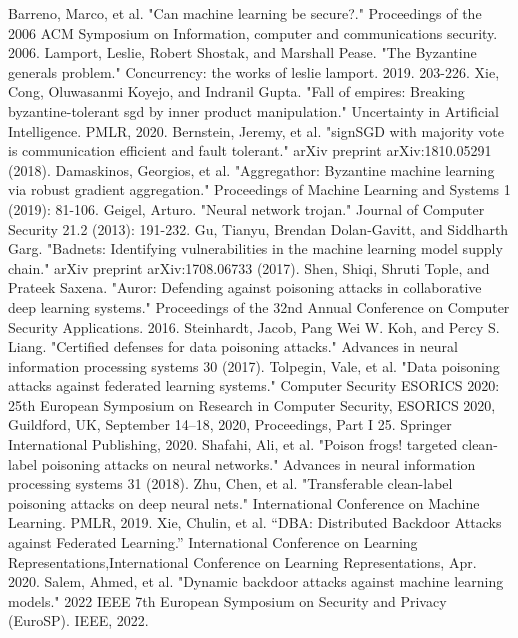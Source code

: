 \documentclass[conference]{IEEEtran}
\begin{document}
\begin{thebibliography}{00}
     Barreno, Marco, et al. "Can machine learning be secure?." Proceedings of the 2006 ACM Symposium on Information, computer and communications security. 2006.
     Lamport, Leslie, Robert Shostak, and Marshall Pease. "The Byzantine generals problem." Concurrency: the works of leslie lamport. 2019. 203-226.
     Xie, Cong, Oluwasanmi Koyejo, and Indranil Gupta. "Fall of empires: Breaking byzantine-tolerant sgd by inner product manipulation." Uncertainty in Artificial Intelligence. PMLR, 2020.
     Bernstein, Jeremy, et al. "signSGD with majority vote is communication efficient and fault tolerant." arXiv preprint arXiv:1810.05291 (2018).
     Damaskinos, Georgios, et al. "Aggregathor: Byzantine machine learning via robust gradient aggregation." Proceedings of Machine Learning and Systems 1 (2019): 81-106.
     Geigel, Arturo. "Neural network trojan." Journal of Computer Security 21.2 (2013): 191-232.
     Gu, Tianyu, Brendan Dolan-Gavitt, and Siddharth Garg. "Badnets: Identifying vulnerabilities in the machine learning model supply chain." arXiv preprint arXiv:1708.06733 (2017).
     Shen, Shiqi, Shruti Tople, and Prateek Saxena. "Auror: Defending against poisoning attacks in collaborative deep learning systems." Proceedings of the 32nd Annual Conference on Computer Security Applications. 2016.
     Steinhardt, Jacob, Pang Wei W. Koh, and Percy S. Liang. "Certified defenses for data poisoning attacks." Advances in neural information processing systems 30 (2017).
     Tolpegin, Vale, et al. "Data poisoning attacks against federated learning systems." Computer Security ESORICS 2020: 25th European Symposium on Research in Computer Security, ESORICS 2020, Guildford, UK, September 14–18, 2020, Proceedings, Part I 25. Springer International Publishing, 2020.
     Shafahi, Ali, et al. "Poison frogs! targeted clean-label poisoning attacks on neural networks." Advances in neural information processing systems 31 (2018).
     Zhu, Chen, et al. "Transferable clean-label poisoning attacks on deep neural nets." International Conference on Machine Learning. PMLR, 2019.
     Xie, Chulin, et al. “DBA: Distributed Backdoor Attacks against Federated Learning.” International Conference on Learning Representations,International Conference on Learning Representations, Apr. 2020.
     Salem, Ahmed, et al. "Dynamic backdoor attacks against machine learning models." 2022 IEEE 7th European Symposium on Security and Privacy (EuroSP). IEEE, 2022.

\end{thebibliography}
\end{document}
